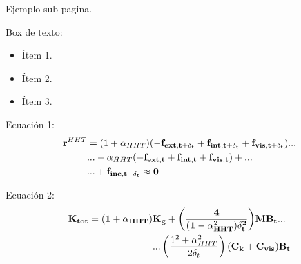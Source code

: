 \documentclass[
  aspectratio=169,
]{beamer}
\begin{document}
\begin{small}
\begin{frame}{Ejemplo sub-pagina.}
	\begin{minipage}[t]{0.4\linewidth}
		\begin{block}{Box de texto:}
			\begin{itemize}
				\item Ítem 1.
				\item Ítem 2. 
				\item Ítem 3.
			\end{itemize}
		\end{block}
	\end{minipage}
	\hspace{1cm}
	\begin{minipage}[t]{0.5\linewidth}
		\vspace{-1.8cm}
		\begin{block}{Ecuación 1:}
			\begin{equation}
			\begin{split}
			\bf{r}^{\text{$HHT$}}&=(1+\alpha_\text{$HHT$})(-\bf{f}_{ext,t+\delta_t}+\bf{f}_{int,t+\delta_t}+\bf{f}_{vis,t+\delta_t})...\\
			&...-\alpha_\text{$HHT$}(-\bf{f}_{ext,t}+\bf{f}_{int,t}+\bf{f}_{vis,t})+...\\
			&...+\bf{f}_{ine,t+\delta_t}	\approx 0
			\end{split}
			\end{equation}
		\end{block}
		\begin{block}{Ecuación 2:}
			\begin{equation}\label{Eq:MET:FinalIncremento}
			\begin{split}
			\bf{K}_{tot}= (1+\alpha_{HHT})&\bf{K}_g+{\left( \frac{4}{(1-\alpha_{HHT}^2) \delta_t^2} \right)} \bf{M}\bf{B}_t...\\ &...\left({\frac{1^2+\alpha^2_{HHT}}{2\delta_t}}\right) (\bf{C}_k+\bf{C}_{vis}) \bf{B}_t 
			\end{split}
			\end{equation}
		\end{block}
	\end{minipage}
\end{frame}




\end{small}
\end{document}
